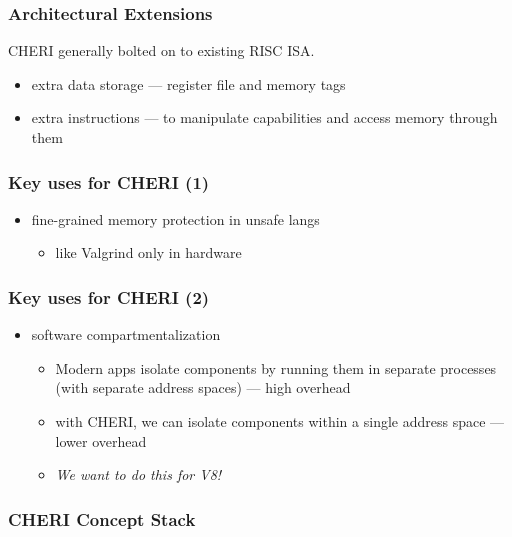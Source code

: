\documentclass[20pt]{beamer}
\begin{document}
\begin{frame}
  \frametitle{Architectural Extensions}
  CHERI generally bolted on to existing RISC ISA.
  \begin{itemize}
  \item extra data storage --- register file and memory tags
  \item extra instructions --- to manipulate capabilities and access memory through them
  \end{itemize}
\end{frame}

\begin{frame}
  \frametitle{Key uses for CHERI (1)}

  \begin{itemize}
  \item fine-grained memory protection in unsafe langs
    \begin{itemize}
       \item {\footnotesize like Valgrind only in hardware}
       \end{itemize}
     \end{itemize}
   \end{frame}

   \begin{frame}
  \frametitle{Key uses for CHERI (2)}
     \begin{itemize}
   \item software compartmentalization
        \begin{itemize}
        \item {\footnotesize Modern apps isolate components by running them in separate processes (with separate address spaces) --- high overhead}
        \item {\footnotesize with CHERI, we can isolate components within a single address space --- lower overhead}
          \item \emph{We want to do this for V8!}
    \end{itemize}

  \end{itemize}
  

\end{frame}


\begin{frame}
  \frametitle{CHERI Concept Stack}

  \begin{center}
\end{center}

\end{frame}
\end{document}
